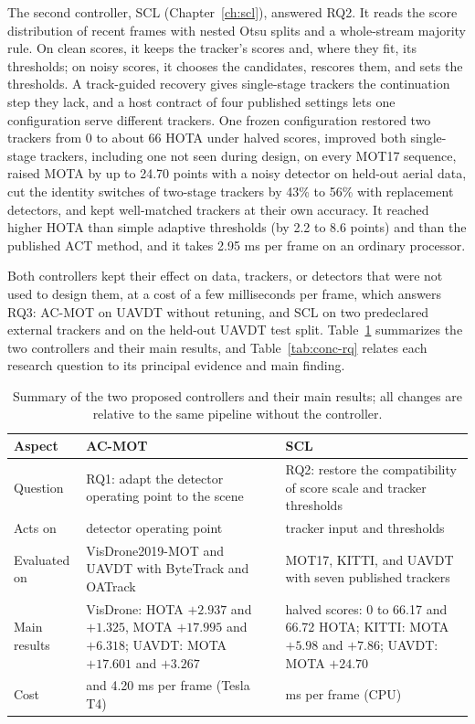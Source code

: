 The second controller, SCL (Chapter~\ref{ch:scl}), answered RQ2. It reads the score distribution of recent frames with nested Otsu splits and a whole-stream majority rule. On clean scores, it keeps the tracker's scores and, where they fit, its thresholds; on noisy scores, it chooses the candidates, rescores them, and sets the thresholds. A track-guided recovery gives single-stage trackers the continuation step they lack, and a host contract of four published settings lets one configuration serve different trackers. One frozen configuration restored two trackers from 0 to about 66 HOTA under halved scores, improved both single-stage trackers, including one not seen during design, on every MOT17 sequence, raised MOTA by up to 24.70 points with a noisy detector on held-out aerial data, cut the identity switches of two-stage trackers by 43\% to 56\% with replacement detectors, and kept well-matched trackers at their own accuracy. It reached higher HOTA than simple adaptive thresholds (by 2.2 to 8.6 points) and than the published ACT method, and it takes 2.95 ms per frame on an ordinary processor.

Both controllers kept their effect on data, trackers, or detectors that were not used to design them, at a cost of a few milliseconds per frame, which answers RQ3: AC-MOT on UAVDT without retuning, and SCL on two predeclared external trackers and on the held-out UAVDT test split. Table~\ref{tab:conc-summary} summarizes the two controllers and their main results, and Table~\ref{tab:conc-rq} relates each research question to its principal evidence and main finding.

\begin{table}[tbp]
\centering
\caption{Summary of the two proposed controllers and their main results; all changes are relative to the same pipeline without the controller.}
\label{tab:conc-summary}
\begin{tabular}{>{\raggedright\arraybackslash}p{2.7cm}>{\raggedright\arraybackslash}p{5.6cm}>{\raggedright\arraybackslash}p{5.6cm}}
\toprule
Aspect & AC-MOT & SCL\\
\midrule
Question & RQ1: adapt the detector operating point to the scene & RQ2: restore the compatibility of score scale and tracker thresholds\\
Acts on & detector operating point & tracker input and thresholds\\
Evaluated on & VisDrone2019-MOT and UAVDT with ByteTrack and OATrack & MOT17, KITTI, and UAVDT with seven published trackers\\
Main results & VisDrone: HOTA $+2.937$ and $+1.325$, MOTA $+17.995$ and $+6.318$; UAVDT: MOTA $+17.601$ and $+3.267$ & halved scores: 0 to 66.17 and 66.72 HOTA; KITTI: MOTA $+5.98$ and $+7.86$; UAVDT: MOTA $+24.70$\\
Cost & 4.26 and 4.20 ms per frame (Tesla T4) & 2.95 ms per frame (CPU)\\
\bottomrule
\end{tabular}
\end{table}

